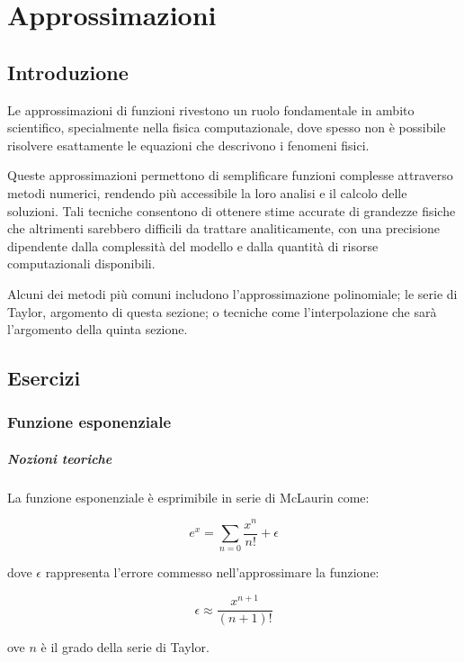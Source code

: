 \setchapterpreamble[u]{\margintoc}
\chapter{Approssimazioni}

\section{Introduzione}

Le approssimazioni di funzioni rivestono un ruolo fondamentale in ambito scientifico,
specialmente nella fisica computazionale, dove spesso non è possibile risolvere
esattamente le equazioni che descrivono i fenomeni fisici.

Queste approssimazioni permettono di semplificare funzioni complesse attraverso
metodi numerici, rendendo più accessibile la loro analisi e il calcolo delle
soluzioni.
Tali tecniche consentono di ottenere stime accurate di grandezze fisiche che
altrimenti sarebbero difficili da trattare analiticamente, con una precisione
dipendente dalla complessità del modello e dalla quantità di risorse computazionali
disponibili.

Alcuni dei metodi più comuni includono l'approssimazione polinomiale;
le serie di Taylor, argomento di questa sezione; o tecniche come l'interpolazione
che sarà l'argomento della quinta sezione.

\section{Esercizi}


\subsection{Funzione esponenziale}

\paragraph{Nozioni teoriche}

La funzione esponenziale è esprimibile in serie di McLaurin come:

$$
	e^x = \sum_{n=0} \frac{x^n}{n!} + \epsilon
$$

dove $\epsilon$ rappresenta l'errore commesso nell'approssimare la funzione:

$$
	\epsilon \approx \frac{x^{n+1}}{(n+1)!}
$$

ove $n$ è il grado della serie di Taylor.


